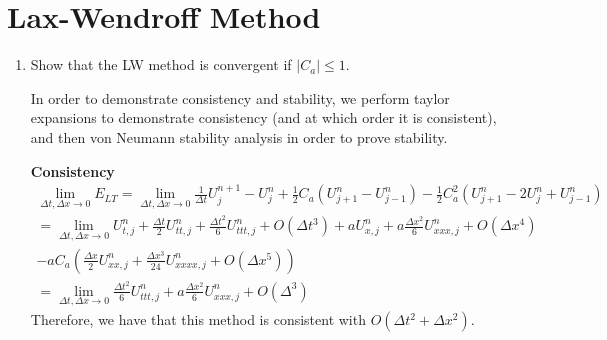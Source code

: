 \documentclass{article}
\begin{document}
\section{Lax-Wendroff Method}

\begin{enumerate}[label = (\alph*)]
    \item Show that the LW method is convergent if $|C_a| \le 1$. 
    
        In order to demonstrate consistency and stability, we perform taylor
        expansions to demonstrate consistency (and at which order it is
        consistent), and then von Neumann stability analysis in order to prove
        stability.

        \textbf{Consistency}
        \begin{gather*}
            \lim_{\Delta t, \Delta x \to 0} E_{LT} = 
            \lim_{\Delta t, \Delta x \to 0} \frac{1}{\Delta t} U_j^{n+1} - U_j^n
            + \frac{1}{2}C_a\left(U_{j+1}^n - U_{j-1}^n\right)
            - \frac{1}{2}C_a^2\left(U_{j+1}^n - 2U_j^n + U_{j-1}^n\right)\\
           =  \lim_{\Delta t, \Delta x \to 0} U_{t, j}^n + 
            \frac{\Delta t}{2}U_{tt, j}^n + \frac{\Delta t^2}{6}U_{ttt, j}^n +
            O(\Delta t^3)
            + aU_{x, j}^n + a\frac{\Delta
            x^2}{6}U_{xxx, j}^n + O(\Delta x^4) \\- aC_a\left(
            \frac{\Delta x}{2}U_{xx, j}^n + \frac{\Delta x^3}{24}U_{xxxx, j}^n
            + O(\Delta x^5)\right)\\
            = \lim_{\Delta t, \Delta x \to 0} \frac{\Delta t^2}{6}U_{ttt, j}^n +
            a \frac{\Delta x^2}{6}U_{xxx, j}^n + O(\Delta^3)
        \end{gather*}
        Therefore, we have that this method is consistent with $O(\Delta t^2 +
        \Delta x^2)$. 


\end{enumerate}
\end{document}
